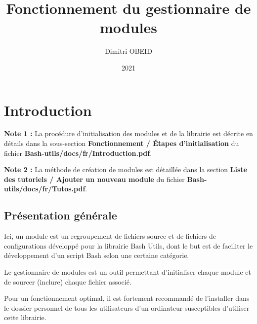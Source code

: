 \documentclass[a4paper,10pt]{article}
\title{\color{sec1}Fonctionnement du gestionnaire de modules}\color{text}
\author{Dimitri OBEID}
\date{2021}
\begin{document}
    \maketitle
    \tableofcontents
    \newpage

    \color{sec1}
    \section{Introduction}\color{text}

    \begin{justify}
        \textbf{Note 1 :} La procédure d'initialisation des modules et de la librairie est décrite en détails dans la sous-section \textbf{\color{sec1}Fonctionnement \color{text} / \color{sec2}Étapes d'initialisation} du fichier \textbf{\color{path}Bash-utils/docs/fr/Introduction.pdf}.
    \end{justify}

    \begin{justify}
        \textbf{Note 2 :} La méthode de création de modules est détaillée dans la section \textbf{\color{sec1}Liste des tutoriels \color{text} / \color{sec2}Ajouter un nouveau module} du fichier \textbf{\color{path}Bash-utils/docs/fr/Tutos.pdf}.
    \end{justify}

    \color{sec2}
    \subsection{Présentation générale}\color{text}

    \begin{justify}
        Ici, un module est un regroupement de fichiers source et de fichiers de configurations développé pour la librairie Bash Utils, dont le but est de faciliter le développement d'un script Bash selon une certaine catégorie.
    \end{justify}

    \begin{justify}
        Le gestionnaire de modules est un outil permettant d'initialiser chaque module et de sourcer (inclure) chaque fichier associé.
    \end{justify}

    \begin{justify}
        Pour un fonctionnement optimal, il est fortement recommandé de l'installer dans le dossier personnel de tous les utilisateurs d'un ordinateur susceptibles d'utiliser cette librairie.
    \end{justify}
\end{document}
